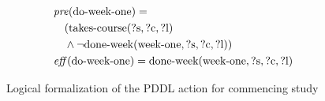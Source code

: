 \begin{figure}[t]
  \begin{align*}
  &\mathit{pre}(\text{do-week-one}) = \\
  &\quad ( \text{takes-course}(\text{?s}, \text{?c}, \text{?l}) \\
  &\quad \land \lnot \text{done-week}(\text{week-one}, \text{?s}, \text{?c}, \text{?l}) ) \\
  &\mathit{eff}(\text{do-week-one}) = \text{done-week}(\text{week-one}, \text{?s}, \text{?c}, \text{?l})
  \end{align*}
  \caption{Logical formalization of the PDDL action for commencing study}\label{fig:do-week-one}
\end{figure}